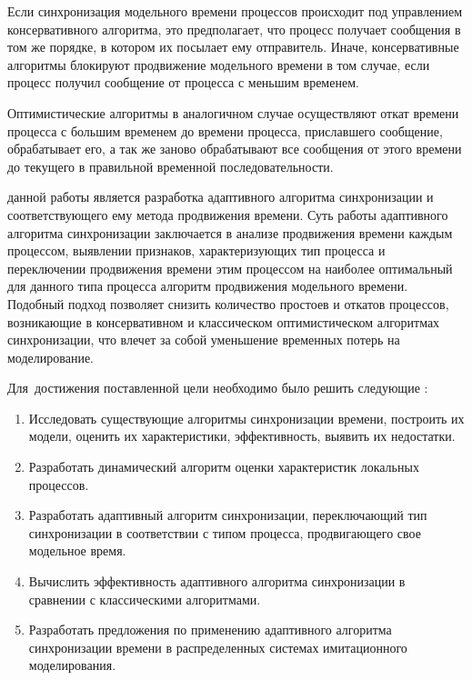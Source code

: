 Если синхронизация модельного времени процессов происходит под управлением консервативного алгоритма, это предполагает, что процесс получает сообщения в том же порядке, в котором их посылает ему отправитель.
Иначе, консервативные алгоритмы блокируют продвижение модельного времени в том случае, если процесс получил сообщение от процесса с меньшим временем.

Оптимистические алгоритмы в аналогичном случае осуществляют откат времени процесса с большим временем до времени процесса, приславшего сообщение, обрабатывает его, а так же заново обрабатывают все сообщения от этого времени до текущего в правильной временной последовательности.




{\aim} данной работы является разработка адаптивного алгоритма синхронизации и соответствующего ему метода продвижения времени. Суть работы адаптивного алгоритма синхронизации заключается в анализе продвижения времени каждым процессом, выявлении признаков, характеризующих тип процесса и переключении продвижения времени этим процессом на наиболее оптимальный для данного типа процесса алгоритм продвижения модельного времени. Подобный подход позволяет снизить количество простоев и откатов процессов, возникающие в консервативном и классическом оптимистическом алгоритмах синхронизации, что влечет за собой уменьшение временных потерь на моделирование.


Для~достижения поставленной цели необходимо было решить следующие {\tasks}:
\begin{enumerate}
    \item Исследовать существующие алгоритмы синхронизации времени, построить их модели, оценить их характеристики, эффективность, выявить их недостатки.
  \item Разработать динамический алгоритм оценки характеристик локальных процессов.
  \item Разработать адаптивный алгоритм синхронизации, переключающий тип синхронизации в соответствии с типом процесса, продвигающего свое модельное время.
  \item Вычислить эффективность адаптивного алгоритма синхронизации в сравнении с классическими алгоритмами.
  \item Разработать предложения по применению адаптивного алгоритма синхронизации времени в распределенных системах имитационного моделирования.
\end{enumerate}


